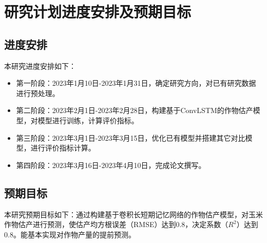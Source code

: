 \section{研究计划进度安排及预期目标}

\subsection{进度安排}
\par 本研究进度安排如下：
\begin{itemize}
  \item 第一阶段：2023年1月10日-2023年1月31日，确定研究方向，对已有研究数据进行预处理。
  \item 第二阶段：2023年2月1日-2023年2月28日，构建基于ConvLSTM的作物估产模型，对模型进行训练，计算评价指标。
  \item 第三阶段：2023年3月1日-2023年3月15日，优化已有模型并搭建其它对比模型，进行评价指标计算。
  \item 第四阶段：2023年3月16日-2023年4月10日，完成论文撰写。
\end{itemize}
\subsection{预期目标}
\par 本研究预期目标如下：通过构建基于卷积长短期记忆网络的作物估产模型，对玉米作物估产进行预测，使估产均方根误差（RMSE）达到0.8，决定系数（$R^2$）达到0.8。能基本实现对作物产量的提前预测。